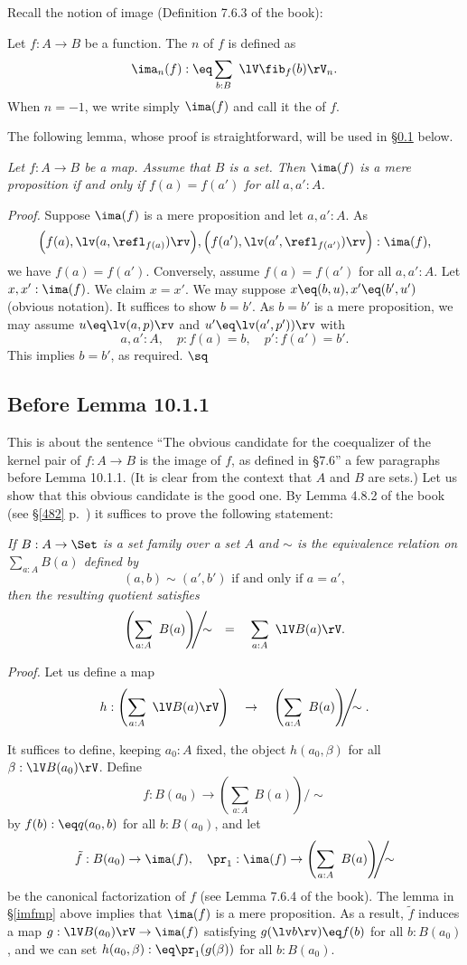\documentclass[12pt]{article}
\begin{document}
Recall the notion of image (Definition 7.6.3 of the book):

\nn{} Let $f:A\to B$ be a function. The $n$ of $f$ is defined as
$$
\ima_n(f):\eq\sum_{b:B}\ \lV\fib_f(b)\rV_n.
$$ 
When $n=-1$, we write simply $\ima(f)$ and call it the  of $f$.

The following lemma, whose proof is straightforward, will be used in \S\ref{1011} below.

\nn{} \emph{Let $f:A\to B$ be a map. Assume that $B$ is a set. Then $\ima(f)$ is a mere proposition if and only if $f(a)=f(a')$ for all $a,a':A$.}

\nn\emph{Proof.} Suppose $\ima(f)$ is a mere proposition and let $a,a':A$. As 
$$
\Big(f(a),\lv(a,\refl_{f(a)})\rv\Big),\Big(f(a'),\lv(a',\refl_{f(a')})\rv\Big):\ima(f),
$$ 
we have $f(a)=f(a')$. Conversely, assume $f(a)=f(a')$ for all $a,a':A$. Let $x,x':\ima(f)$. We claim $x=x'$. We may suppose $x\eq(b,u),x'\eq(b',u')$ (obvious notation). It suffices to show $b=b'$. As $b=b'$ is a mere proposition, we may assume $u\eq\lv(a,p)\rv$ and $u'\eq\lv(a',p'))\rv$ with 
$$
a,a':A,\quad p:f(a)=b,\quad p':f(a')=b'.
$$ 
This implies $b=b'$, as required. $\sq$


\subsection{Before Lemma 10.1.1}\label{1011}

This is about the sentence ``The obvious candidate for the coequalizer of the kernel pair of $f:A\to B$ is the image of $f$, as defined in \S7.6'' a few paragraphs before Lemma 10.1.1. (It is clear from the context that $A$ and $B$ are sets.) Let us show that this obvious candidate is the good one. By Lemma 4.8.2 of the book (see \S\ref{482} p.~\pageref{482}) it suffices to prove the following statement:

\emph{If $B:A\to\Set$ is a set family over a set $A$ and $\sim$ is the equivalence relation on $\sum_{a:A}B(a)$ defined by 
$$
(a,b)\sim(a',b')\text{ if and only if }a=a',
$$ 
then the resulting quotient satisfies}
$$
\left(\sum_{a:A}\ B(a)\right)\!\!\!\Bigg/\!\!\!\!\sim\quad=\quad\sum_{a:A}\ \lV B(a)\rV.
$$

\nn\emph{Proof.} Let us define a map 
$$
h:\left(\sum_{a:A}\ \lV B(a)\rV\right)\quad\to\quad\left(\sum_{a:A}\ B(a)\right)\!\!\!\Bigg/\!\!\!\!\sim.
$$ 

It suffices to define, keeping $a_0:A$ fixed, the object $h(a_0,\beta)$ for all $\beta:\lV B(a_0)\rV$. Define 
$$
f:B(a_0)\to\left(\sum_{a:A}\ B(a)\right)\!\!\!\Bigg/\!\!\!\!\sim
$$ 
by $f(b):\eq q(a_0,b)$ for all $b:B(a_0)$, and let 
$$
\tilde f:B(a_0)\to\ima(f),\quad\pr_1:\ima(f)\to\left(\sum_{a:A}\ B(a)\right)\!\!\!\Bigg/\!\!\!\!\sim
$$ 
be the canonical factorization of $f$ (see Lemma 7.6.4 of the book). The lemma in \S\ref{imfmp} above implies that $\ima(f)$ is a mere proposition. As a result, $\tilde f$ induces a map $g:\lV B(a_0)\rV\to\ima(f)$ satisfying $g(\lv b\rv)\eq f(b)$ for all $b:B(a_0)$, and we can set $h(a_0,\beta):\eq\pr_1(g(\beta))$ for all $b:B(a_0)$.
\end{document}
